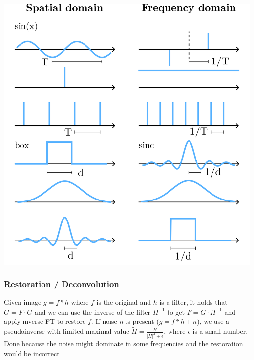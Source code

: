 \documentclass[a4paper,10pt]{article}
\begin{document}
\begin{center}
    \includegraphics[width=\linewidth]{fourier-transforms.png}
\end{center}

\subsubsection{Restoration / Deconvolution} Given image \( g = f * h \) where \( f \) is the original and \( h \) is a filter, it holds that \( G = F \cdot G \) and we can use the inverse of the filter \( H^{-1} \) to get \( F = G \cdot H^{-1} \) and apply inverse FT to restore \( f \). If noise \( n \) is present (\( g = f * h + n \)), we use a pseudoinverse with limited maximal value \( \tilde{H} = \frac{H}{|H|^2+\epsilon } \), where \( \epsilon  \) is a small number. Done because the noise might dominate in some frequencies and the restoration would be incorrect
\end{document}
